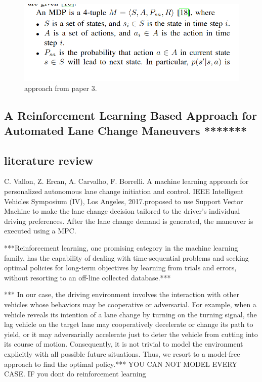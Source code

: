 \documentclass{article}
\begin{document}
\begin{figure}
 \includegraphics[width=\linewidth]{fig3.png}
 \caption{approach from paper 3.}
 \label{fig:Gui}
\end{figure}


\subsection{A Reinforcement Learning Based Approach for Automated Lane
Change Maneuvers *******}
\subsection{literature review}
C. Vallon, Z. Ercan, A. Carvalho, F. Borrelli. A machine learning
approach for personalized autonomous lane change initiation and
control. IEEE Intelligent Vehicles Symposium (IV), Los Angeles,
2017.proposed to use Support
Vector Machine to make the lane change decision
tailored to the driver’s individual driving preferences.
After the lane change demand is generated, the maneuver
is executed using a MPC.

***Reinforcement learning, one promising category in
the machine learning family, has the capability of dealing
with time-sequential problems and seeking optimal
policies for long-term objectives by learning from trials
and errors, without resorting to an off-line collected
database.***

***
In our case, the driving environment involves the
interaction with other vehicles whose behaviors may be
cooperative or adversarial. For example, when a vehicle
reveals its intention of a lane change by turning on the
turning signal, the lag vehicle on the target lane may
cooperatively decelerate or change its path to yield, or it
may adversarially accelerate just to deter the vehicle from
cutting into its course of motion. Consequently, it is not
trivial to model the environment explicitly with all
possible future situations. Thus, we resort to a model-free
approach to find the optimal policy.*** YOU CAN NOT MODEL EVERY CASE. IF you dont do reinforcement learning
\end{document}
